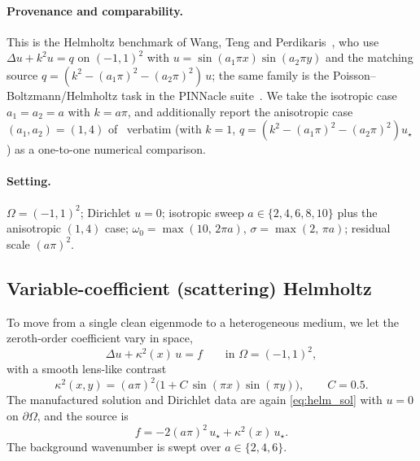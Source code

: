 \paragraph{Provenance and comparability.}
This is the Helmholtz benchmark of Wang, Teng and
Perdikaris~\cite{Wang2021Pathologies}, who use
\(\Delta u + k^2 u = q\) on \((-1,1)^2\) with
\(u = \sin(a_1\pi x)\sin(a_2\pi y)\) and the matching source
\(q = (k^2 - (a_1\pi)^2 - (a_2\pi)^2)\,u\); the same family is the
Poisson--Boltzmann/Helmholtz task in the PINNacle suite~\cite{Hao2024PINNacle}.
We take the isotropic case \(a_1 = a_2 = a\) with \(k = a\pi\), and additionally
report the anisotropic case \((a_1,a_2) = (1,4)\) of~\cite{Wang2021Pathologies}
verbatim (with \(k=1\), \(q = (k^2 - (a_1\pi)^2 - (a_2\pi)^2)u_\star\)) as a
one-to-one numerical comparison.

\paragraph{Setting.}
\(\Omega=(-1,1)^2\); Dirichlet \(u=0\); isotropic sweep \(a\in\{2,4,6,8,10\}\)
plus the anisotropic \((1,4)\) case; \(\omega_0 = \max(10,\,2\pi a)\),
\(\sigma = \max(2,\,\pi a)\); residual scale \((a\pi)^2\).

\subsection{Variable-coefficient (scattering) Helmholtz}\label{sec:bm:helmvc}

To move from a single clean eigenmode to a heterogeneous medium, we let the
zeroth-order coefficient vary in space,
\begin{equation}\label{eq:helmvc_pde}
  \Delta u + \kappa^2(x)\,u = f
  \qquad \text{in } \Omega = (-1,1)^2,
\end{equation}
with a smooth lens-like contrast
\begin{equation}\label{eq:helmvc_kappa}
  \kappa^2(x,y) = (a\pi)^2\big(1 + C\,\sin(\pi x)\sin(\pi y)\big),
  \qquad C = 0.5 .
\end{equation}
The manufactured solution and Dirichlet data are again
\eqref{eq:helm_sol} with \(u=0\) on \(\partial\Omega\), and the source is
\begin{equation}\label{eq:helmvc_source}
  f = -2(a\pi)^2\,u_\star + \kappa^2(x)\,u_\star .
\end{equation}
The background wavenumber is swept over \(a \in \{2,4,6\}\).

